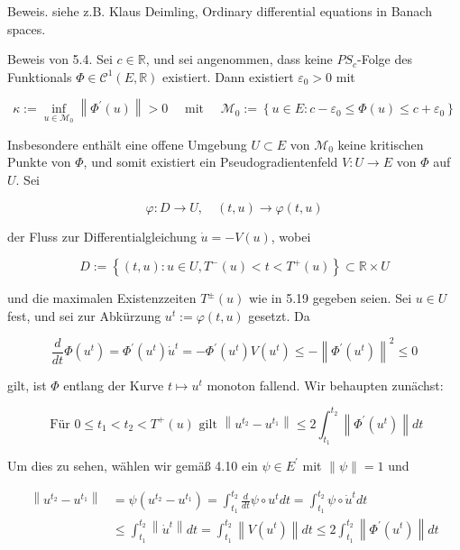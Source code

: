 \documentclass[10pt, letterpaper]{article}
\begin{document}
Beweis. siehe z.B. Klaus Deimling, Ordinary differential equations in Banach spaces.

Beweis von 5.4. Sei $c \in \mathbb{R}$, und sei angenommen, dass keine $P S_{c}$-Folge des Funktionals $\Phi \in \mathcal{C}^{1}(E, \mathbb{R})$ existiert. Dann existiert $\varepsilon_{0}>0$ mit

$$
\kappa:=\inf _{u \in \mathcal{M}_{0}}\left\|\Phi^{\prime}(u)\right\|>0 \quad \text { mit } \quad \mathcal{M}_{0}:=\left\{u \in E: c-\varepsilon_{0} \leq \Phi(u) \leq c+\varepsilon_{0}\right\}
$$

Insbesondere enthält eine offene Umgebung $U \subset E$ von $\mathcal{M}_{0}$ keine kritischen Punkte von $\Phi$, und somit existiert ein Pseudogradientenfeld $V: U \rightarrow E$ von $\Phi$ auf $U$. Sei

$$
\varphi: D \rightarrow U, \quad(t, u) \rightarrow \varphi(t, u)
$$

der Fluss zur Differentialgleichung $\dot{u}=-V(u)$, wobei

$$
D:=\left\{(t, u): u \in U, T^{-}(u)<t<T^{+}(u)\right\} \subset \mathbb{R} \times U
$$

und die maximalen Existenzzeiten $T^{ \pm}(u)$ wie in 5.19 gegeben seien. Sei $u \in U$ fest, und sei zur Abkürzung $u^{t}:=\varphi(t, u)$ gesetzt. Da

$$
\frac{d}{d t} \Phi\left(u^{t}\right)=\Phi^{\prime}\left(u^{t}\right) \dot{u}^{t}=-\Phi^{\prime}\left(u^{t}\right) V\left(u^{t}\right) \leq-\left\|\Phi^{\prime}\left(u^{t}\right)\right\|^{2} \leq 0
$$

gilt, ist $\Phi$ entlang der Kurve $t \mapsto u^{t}$ monoton fallend. Wir behaupten zunächst:

$$
\text { Für } 0 \leq t_{1}<t_{2}<T^{+}(u) \text { gilt }\left\|u^{t_{2}}-u^{t_{1}}\right\| \leq 2 \int_{t_{1}}^{t_{2}}\left\|\Phi^{\prime}\left(u^{t}\right)\right\| d t
$$

Um dies zu sehen, wählen wir gemäß 4.10 ein $\psi \in E^{\prime}$ mit $\|\psi\|=1$ und

$$
\begin{aligned}
\left\|u^{t_{2}}-u^{t_{1}}\right\| & =\psi\left(u^{t_{2}}-u^{t_{1}}\right)=\int_{t_{1}}^{t_{2}} \frac{d}{d t} \psi \circ u^{t} d t=\int_{t_{1}}^{t_{2}} \psi \circ \dot{u}^{t} d t \\
& \leq \int_{t_{1}}^{t_{2}}\left\|\dot{u}^{t}\right\| d t=\int_{t_{1}}^{t_{2}}\left\|V\left(u^{t}\right)\right\| d t \leq 2 \int_{t_{1}}^{t_{2}}\left\|\Phi^{\prime}\left(u^{t}\right)\right\| d t
\end{aligned}
$$
\end{document}
